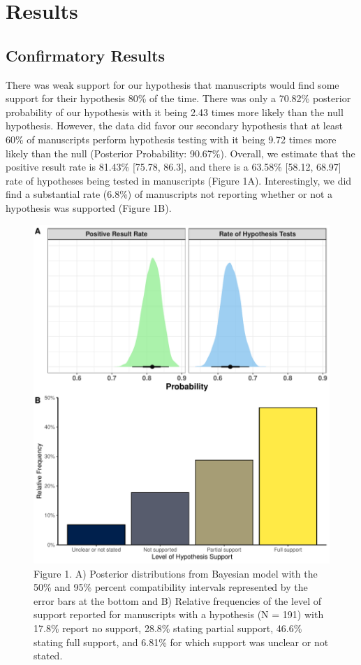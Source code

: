 \documentclass[]{cik}%
\begin{document}
\hypertarget{results}{%
\section{Results}\label{results}}

\hypertarget{confirmatory-results}{%
\subsection{Confirmatory Results}\label{confirmatory-results}}

There was weak support for our hypothesis that manuscripts would find
some support for their hypothesis 80\% of the time. There was only a
70.82\% posterior probability of our hypothesis with it being 2.43 times
more likely than the null hypothesis. However, the data did favor our
secondary hypothesis that at least 60\% of manuscripts perform
hypothesis testing with it being 9.72 times more likely than the null
(Posterior Probability: 90.67\%). Overall, we estimate that the positive
result rate is 81.43\% {[}75.78, 86.3{]}, and there is a 63.58\%
{[}58.12, 68.97{]} rate of hypotheses being tested in manuscripts
(Figure 1A). Interestingly, we did find a substantial rate (6.8\%) of
manuscripts not reporting whether or not a hypothesis was supported
(Figure 1B).

\begin{figure}[H]
\includegraphics[width=0.9\linewidth]{figure1} \caption{Figure 1. A) Posterior distributions from Bayesian model with the 50\% and 95\% percent compatibility intervals represented by the error bars at the bottom and B) Relative frequencies of the level of support reported for manuscripts with  a hypothesis (N = 191) with 17.8\% report no support, 28.8\% stating partial support, 46.6\% stating full support, and  6.81\% for which support was unclear or not stated.}\label{fig:fig1}
\end{figure}
\end{document}
